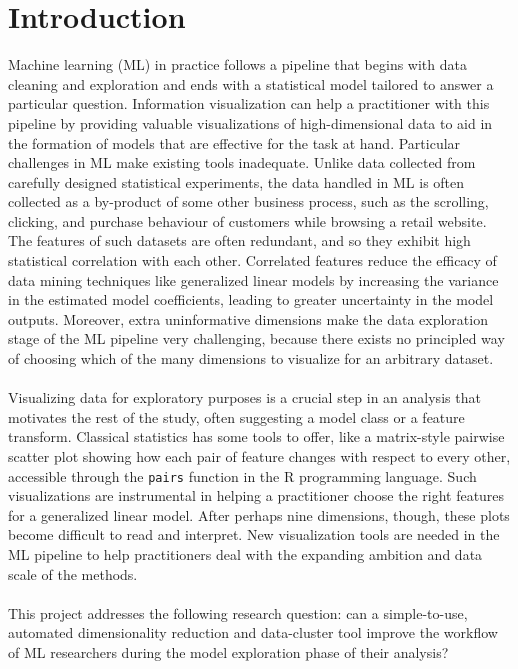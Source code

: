 \documentclass{sigchi}
\begin{document}
\section{Introduction}
%
%
%
Machine learning (ML) in practice follows a pipeline that begins with data cleaning and exploration and ends with a statistical model tailored to answer a particular question. %
%
Information visualization can help a practitioner with this pipeline by providing valuable visualizations of high-dimensional data to aid in the formation of models that are effective for the task at hand. %
%
Particular challenges in ML make existing tools inadequate. %
%
Unlike data collected from carefully designed statistical experiments, the data handled in ML is often collected as a by-product of some other business process, such as the scrolling, clicking, and purchase behaviour of customers while browsing a retail website. %
%
The features of such datasets are often redundant, and so they exhibit high statistical correlation with each other. %
%
Correlated features reduce the efficacy of data mining techniques like generalized linear models by increasing the variance in the estimated model coefficients, leading to greater uncertainty in the model outputs. %
%
Moreover, extra uninformative dimensions make the data exploration stage of the ML pipeline very challenging, because there exists no principled way of choosing which of the many dimensions to visualize for an arbitrary dataset. %
%
\\\\
%
Visualizing data for exploratory purposes is a crucial step in an analysis that motivates the rest of the study, often suggesting a model class or a feature transform. %
%
Classical statistics has some tools to offer, like a matrix-style pairwise scatter plot showing how each pair of feature changes with respect to every other, accessible through the \texttt{pairs} function in the R programming language. %
%
Such visualizations are instrumental in helping a practitioner choose the right features for a generalized linear model. %
%
After perhaps nine dimensions, though, these plots become difficult to read and interpret. %
New visualization tools are needed in the ML pipeline to help practitioners deal with the expanding ambition and data scale of the methods. %
%
\\\\
%
This project addresses the following research question: can a simple-to-use, automated dimensionality reduction and data-cluster tool improve the workflow of ML researchers during the model exploration phase of their analysis? %
\end{document}
